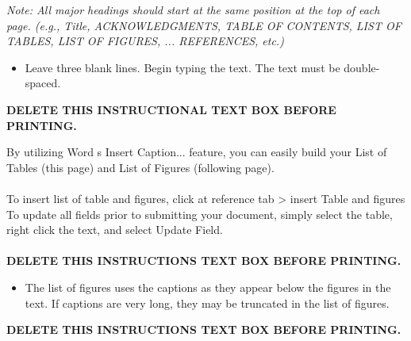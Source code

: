 \documentclass{article}
\begin{document}
\begin{tcolorbox}[enhanced jigsaw,
    sharp corners,
    boxrule=0.5pt, 
    colback=blue!30!white,   
    borderline={0.5pt}{-2pt}{black,solid} %
 ]
 \begin{justify}
 \emph{Note: All major headings should start at the same position at the top of each page. (e.g., Title, ACKNOWLEDGMENTS, TABLE OF CONTENTS, LIST OF TABLES, LIST OF FIGURES, ... REFERENCES, etc.)}
\begin{itemize}
    \item Leave three blank lines. Begin typing the text. The text must be double-spaced.
\end{itemize}
\bf {DELETE THIS INSTRUCTIONAL TEXT BOX BEFORE PRINTING.}
\end{justify}
\end{tcolorbox}


\newpage


\begin{tcolorbox}[enhanced jigsaw,
    sharp corners,
    boxrule=0.5pt, 
    colback=blue!30!white,   
    borderline={0.5pt}{-2pt}{black,solid} %
 ]
\begin{justify}
By utilizing Word s  Insert Caption...  feature, you can easily build your List of Tables (this page) and List of Figures (following page). \\~\\ 
To insert list of table and figures, click at reference tab > insert Table and figures
To update all fields prior to submitting your document, simply select the table, right click the text, and select  Update Field. \\~\\
{\bf DELETE THIS INSTRUCTIONS TEXT BOX BEFORE PRINTING.}
\end{justify}
\end{tcolorbox}

\pagebreak

\begin{tcolorbox}[enhanced jigsaw,
    sharp corners,
    boxrule=0.5pt, 
    colback=blue!30!white,   
    borderline={0.5pt}{-2pt}{black,solid} %
 ]
 \begin{justify}
     \begin{itemize}
    \item The list of figures uses the captions as they appear below the figures in the text. If captions are very long, they may be truncated in the list of figures.
    \end{itemize}\vspace{1cm}
{\bf DELETE THIS INSTRUCTIONS TEXT BOX BEFORE PRINTING.}
\end{justify}
\end{tcolorbox}
\newpage
{}
\end{document}
